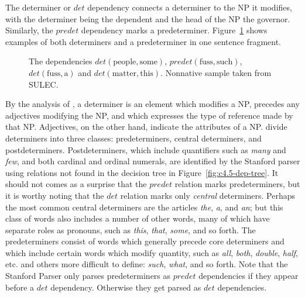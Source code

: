 \documentclass[main.tex]{subfiles}
\begin{document}
The determiner or $det$ dependency connects a determiner to the NP it modifies, with the determiner being the dependent and the head of the NP the governor. Similarly, the $predet$ dependency marks a predeterminer. Figure~\ref{ex:det} shows examples of both determiners and a predeterminer in one sentence fragment. 
\begin{figure}[ht]
\centering
{}
\caption{The dependencies $det(\text{people},\text{some})$, $predet(\text{fuss},\text{such})$, $det(\text{fuss},\text{a})$ and $det(\text{matter},\text{this})$. Nonnative sample taken from SULEC.}
\label{ex:det}
\end{figure}
By the analysis of \citet[Ch. 5.10]{quirk:1985}, a determiner is an element which modifies a NP, precedes any adjectives modifying the NP, and which expresses the type of reference made by that NP. Adjectives, on the other hand, indicate the attributes of a NP. \citeauthor{quirk:1985} divide determiners into three classes: predeterminers, central determiners, and postdeterminers. Postdeterminers, which include quantifiers such as \textit{many} and \textit{few}, and both cardinal and ordinal numerals, are identified by the Stanford parser using relations not found in the decision tree in Figure~\ref{fig:c4.5-dep-tree}. It should not comes as a surprise that the $predet$ relation marks predeterminers, but it is worthy noting that the $det$ relation marks only \textit{central} determiners. Perhaps the most common central determiners are the articles \textit{the}, \textit{a}, and \textit{an}; but this class of words also includes a number of other words, many of which have separate roles as pronouns, such as \textit{this}, \textit{that}, \textit{some}, and so forth. The predeterminers consist of words which generally precede core determiners and which include certain words which modify quantity, such as \textit{all}, \textit{both}, \textit{double}, \textit{half}, etc. and others more difficult to define: \textit{such}, \textit{what}, and so forth. Note that the Stanford Parser only parses predeterminers as $predet$ dependencies if they appear before a $det$ dependency. Otherwise they get parsed as $det$ dependencies.
\end{document}
